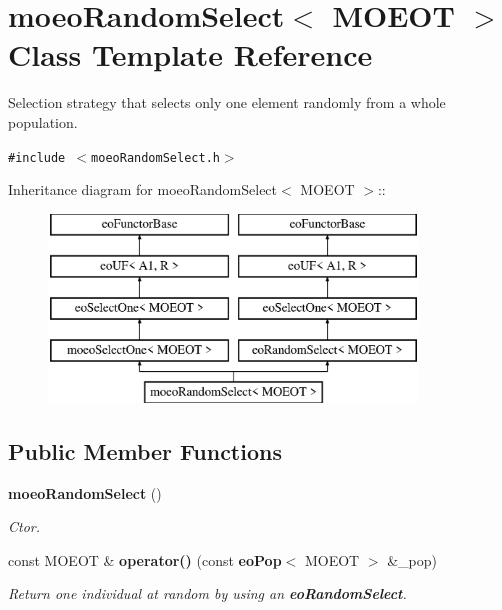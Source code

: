 \section{moeo\-Random\-Select$<$ MOEOT $>$ Class Template Reference}
\label{classmoeoRandomSelect}
Selection strategy that selects only one element randomly from a whole population.  


{\tt \#include $<$moeo\-Random\-Select.h$>$}

Inheritance diagram for moeo\-Random\-Select$<$ MOEOT $>$::\begin{figure}[H]
\begin{center}
\leavevmode
\includegraphics[height=5cm]{classmoeoRandomSelect}
\end{center}
\end{figure}
\subsection*{Public Member Functions}
\begin{CompactItemize}
\item 
{\bf moeo\-Random\-Select} ()\label{classmoeoRandomSelect_209022add1e1750f28497dfe637bb5dc}

\begin{CompactList}\small\item\em Ctor. \item\end{CompactList}\item 
const MOEOT \& {\bf operator()} (const {\bf eo\-Pop}$<$ MOEOT $>$ \&\_\-pop)\label{classmoeoRandomSelect_96dbd0832ad677090ef79ff3867d7af9}

\begin{CompactList}\small\item\em Return one individual at random by using an {\bf eo\-Random\-Select}. \item\end{CompactList}\end{CompactItemize}


